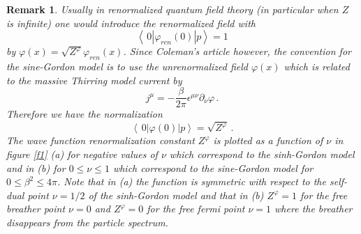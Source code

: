 \documentclass[a4paper,a4paper]{article}
\newtheorem{remark}[theorem]{Remark}
\begin{document}
\begin{remark}
Usually in renormalized quantum field theory (in particular when $Z$ is
infinite) one would introduce the renormalized field with 
\[
\left\langle \,0\left| \varphi _{ren}(0)\right| p\right\rangle =1 
\]
by $\varphi (x)=\sqrt{Z^{\varphi }}\varphi _{ren}(x)$. Since Coleman's
article \cite{Co} however, the convention for the sine-Gordon model is to
use the unrenormalized field $\varphi (x)$ which is related to the massive
Thirring model current by 
\[
j^{\mu }=-\frac{\beta }{2\pi }\epsilon ^{\mu \nu }\partial _{\nu }\varphi
\,. 
\]
Therefore we have the normalization 
\[
\left\langle \,0\left| \varphi (0)\right| p\right\rangle =\sqrt{Z^{\varphi }}%
\,. 
\]
The wave function renormalization constant $Z^{\varphi }$ is plotted as a
function of $\nu $ in figure \ref{f1} (a) for negative values of $\nu $
which correspond to the sinh-Gordon model and in (b) for $0\leq \nu \leq 1$
which correspond to the sine-Gordon model for $0\leq \beta ^{2}\leq 4\pi $.
Note that in (a) the function is symmetric with respect to the self-dual
point $\nu =1/2$ of the sinh-Gordon model and that in (b) $Z^{\varphi }=1$
for the free breather point $\nu =0$ and $Z^{\varphi }=0$ for the free fermi
point $\nu =1$ where the breather disappears from the particle spectrum.
\end{remark}
\end{document}
